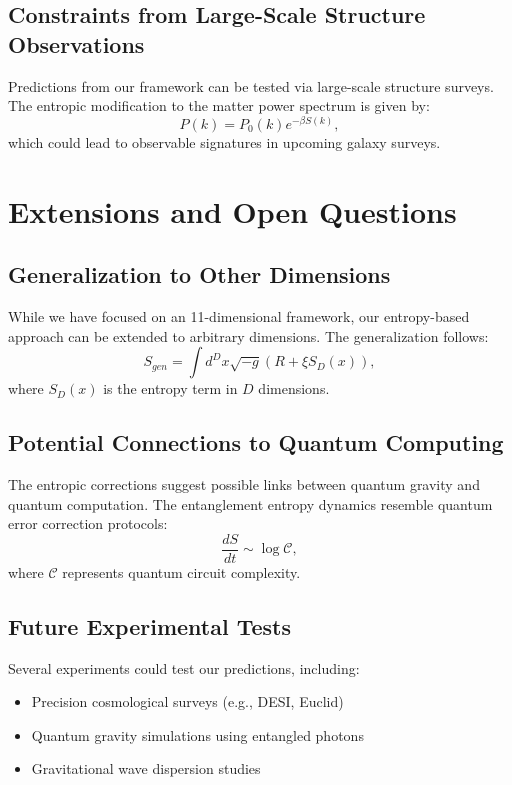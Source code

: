 \documentclass{article}
\begin{document}
\subsection{Constraints from Large-Scale Structure Observations}
Predictions from our framework can be tested via large-scale structure surveys. The entropic modification to the matter power spectrum is given by:
\begin{equation}
P(k) = P_0(k) e^{-\beta S(k)},
\end{equation}
which could lead to observable signatures in upcoming galaxy surveys.

\section{Extensions and Open Questions}

\subsection{Generalization to Other Dimensions}
While we have focused on an 11-dimensional framework, our entropy-based approach can be extended to arbitrary dimensions. The generalization follows:
\begin{equation}
S_{gen} = \int d^D x \sqrt{-g} \left( R + \xi S_{D}(x) \right),
\end{equation}
where $S_D(x)$ is the entropy term in $D$ dimensions.

\subsection{Potential Connections to Quantum Computing}
The entropic corrections suggest possible links between quantum gravity and quantum computation. The entanglement entropy dynamics resemble quantum error correction protocols:
\begin{equation}
\frac{dS}{dt} \sim \log \mathcal{C},
\end{equation}
where $\mathcal{C}$ represents quantum circuit complexity.

\subsection{Future Experimental Tests}
Several experiments could test our predictions, including:
\begin{itemize}
    \item Precision cosmological surveys (e.g., DESI, Euclid)
    \item Quantum gravity simulations using entangled photons
    \item Gravitational wave dispersion studies
\end{itemize}
\end{document}
